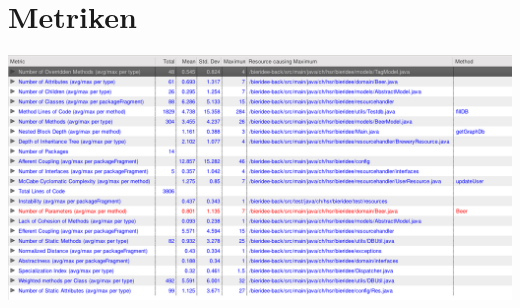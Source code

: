 \documentclass[10pt,a4paper]{scrartcl}
\begin{document}
\section{Metriken}
\includegraphics[scale=0.5, angle=90]{metrics.png}
\end{document}
